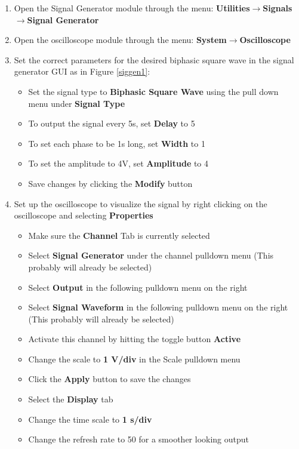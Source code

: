 \begin{enumerate}
\item Open the Signal Generator module through the menu: \textbf{Utilities}$\rightarrow$\textbf{Signals}$\rightarrow$\textbf{Signal Generator}
\item Open the oscilloscope module through the menu: \textbf{System}$\rightarrow$\textbf{Oscilloscope}
\item Set the correct parameters for the desired biphasic square wave in the signal generator GUI as in Figure \ref{siggen1}:
  \begin{itemize}
  \item Set the signal type to \textbf{Biphasic Square Wave} using the pull down menu under \textbf{Signal Type}
  \item To output the signal every 5s, set \textbf{Delay} to 5
  \item To set each phase to be 1s long, set \textbf{Width} to 1
  \item To set the amplitude to 4V, set \textbf{Amplitude} to 4
  \item Save changes by clicking the \textbf{Modify} button
  \end{itemize}
\item Set up the oscilloscope to visualize the signal by right clicking on the oscilloscope and selecting \textbf{Properties}
  \begin{itemize}
  \item Make sure the \textbf{Channel} Tab is currently selected
  \item Select \textbf{Signal Generator} under the channel pulldown menu (This probably will already be selected)
  \item Select \textbf{Output} in the following pulldown menu on the right
  \item Select \textbf{Signal Waveform} in the following pulldown menu on the right (This probably will already be selected)
  \item Activate this channel by hitting the toggle button \textbf{Active}
  \item Change the scale to \textbf{1 V/div} in the Scale pulldown menu
  \item Click the \textbf{Apply} button to save the changes
  \item Select the \textbf{Display} tab
  \item Change the time scale to \textbf{1 s/div}
  \item Change the refresh rate to 50 for a smoother looking output

\end{itemize}
\end{enumerate}
